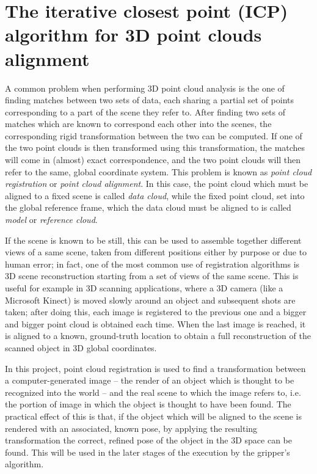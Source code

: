 \section{The iterative closest point (ICP) algorithm for 3D point clouds
alignment} \label{sec:icp}

A common problem when performing 3D point cloud analysis is the one of finding
matches between two sets of data, each sharing a partial set of points
corresponding to a part of the scene they refer to. After finding two sets of
matches which are known to correspond each other into the scenes, the
corresponding rigid transformation between the two can be computed. If one of the two
point clouds is then transformed using this transformation, the matches will
come in (almost) exact correspondence, and the two point clouds will then refer
to the same, global coordinate system. This problem is known as
\emph{point cloud registration} or \emph{point cloud alignment}. In this case,
the point cloud which must be aligned to a fixed scene is called \emph{data
cloud}, while the fixed point cloud, set into the global reference frame, 
which the data cloud must be aligned to is called \emph{model} or
\emph{reference cloud}.

If the scene is known to be still, this can be used to assemble together
different views of a same scene,
taken from different positions either by purpose or due to human error; in
fact, one of the most common use of registration algorithms is 3D scene
reconstruction starting from a set of views of the same scene. This is useful
for example in 3D scanning applications, where a 3D camera (like a Microsoft
Kinect) is moved slowly around an object and subsequent shots are taken;
after doing this, each image is registered to the previous one and a
bigger and bigger point cloud is obtained each time. When the last image is
reached, it is aligned to a known, ground-truth location to obtain a full
reconstruction of the scanned object in 3D global coordinates.

In this project, point cloud registration is used to find a transformation
between a computer-generated image -- the render of an object which is thought
to be recognized into the world -- and the real scene to which the image refers
to, i.e. the portion of image in which the object is thought to have been
found. The practical effect of this is that, if the object which will be
aligned to the scene is rendered with an associated, known pose, by applying
the resulting transformation the correct, refined pose of the object in the 3D
space can be found. This will be used in the later stages of the execution by
the gripper's algorithm.

